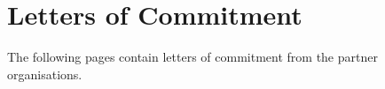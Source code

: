 \section{Letters of Commitment}
\label{sec:letters}

The following pages contain letters of commitment from the partner organisations.

%
